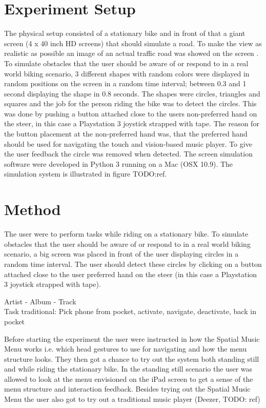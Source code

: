 \section{Experiment Setup}
The physical setup consisted of a stationary bike and in front of that a giant screen (4 x 40 inch HD screens) that should simulate a road. To make the view as realistic as possible an image of an actual traffic road was showed on the screen \footnotemark[1]. To simulate obstacles that the user should be aware of or respond to in a real world biking scenario, 3 different shapes with random colors were displayed in random positions on the screen in a random time interval; between 0.3 and 1 second displaying the shape in 0.8 seconds. The shapes were circles, triangles and squares and the job for the person riding the bike was to detect the circles. This was done by pushing a button attached close to the users non-preferred hand on the steer, in this case a Playstation 3 joystick strapped with tape. The reason for the button placement at the non-preferred hand was, that the preferred hand should be used for navigating the touch and vision-based music player. To give the user feedback the circle was removed when detected. The screen simulation software were developed in Python 3 running on a Mac (OSX 10.9). The simulation system is illustrated in figure TODO:ref.



\section{Method}
The user were to perform tasks while riding on a stationary bike. To simulate obstacles that the user should be aware of or respond to in a real world biking scenario, a big screen was placed in front of the user displaying circles in a random time interval. The user should detect these circles by clicking on a button attached close to the user preferred hand on the steer (in this case a Playstation 3 joystick strapped with tape).

Artist - Album - Track\\
Task traditional: Pick phone from pocket, activate, navigate, deactivate, back in pocket

Before starting the experiment the user were instructed in how the Spatial Music Menu works i.e. which head gestures to use for navigating and how the menu structure looks. They then got a chance to try out the system both standing still and while riding the stationary bike. In the standing still scenario the user was allowed to look at the menu envisioned on the iPad screen to get a sense of the menu structure and interaction feedback. Besides trying out the Spatial Music Menu the user also got to try out a traditional music player (Deezer, TODO: ref)

